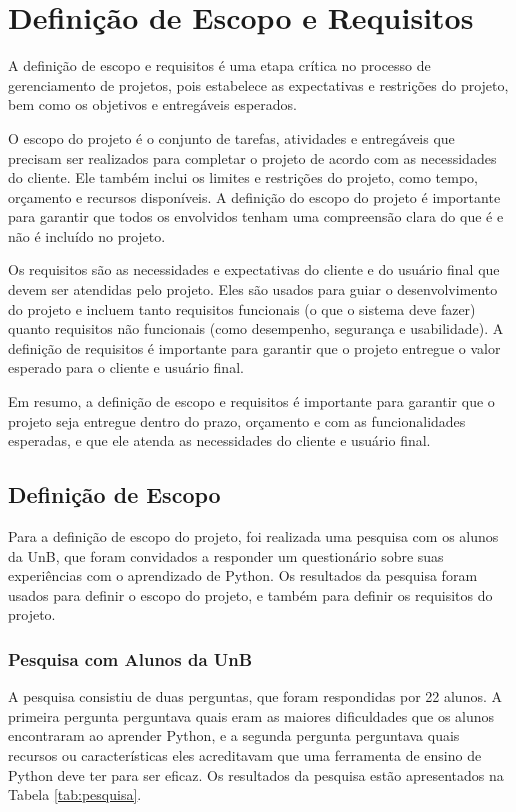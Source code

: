 \section{Definição de Escopo e Requisitos}

A definição de escopo e requisitos é uma etapa crítica no processo de gerenciamento de projetos, pois estabelece as expectativas e restrições do projeto, bem como os objetivos e entregáveis esperados.

O escopo do projeto é o conjunto de tarefas, atividades e entregáveis que precisam ser realizados para completar o projeto de acordo com as necessidades do cliente. Ele também inclui os limites e restrições do projeto, como tempo, orçamento e recursos disponíveis. A definição do escopo do projeto é importante para garantir que todos os envolvidos tenham uma compreensão clara do que é e não é incluído no projeto. \cite{Xavier2009}

Os requisitos são as necessidades e expectativas do cliente e do usuário final que devem ser atendidas pelo projeto. Eles são usados para guiar o desenvolvimento do projeto e incluem tanto requisitos funcionais (o que o sistema deve fazer) quanto requisitos não funcionais (como desempenho, segurança e usabilidade). A definição de requisitos é importante para garantir que o projeto entregue o valor esperado para o cliente e usuário final. \cite{Machado2018}

Em resumo, a definição de escopo e requisitos é importante para garantir que o projeto seja entregue dentro do prazo, orçamento e com as funcionalidades esperadas, e que ele atenda as necessidades do cliente e usuário final.

\subsection{Definição de Escopo}

Para a definição de escopo do projeto, foi realizada uma pesquisa com os alunos da UnB, que foram convidados a responder um questionário sobre suas experiências com o aprendizado de Python. Os resultados da pesquisa foram usados para definir o escopo do projeto, e também para definir os requisitos do projeto.

\subsubsection{Pesquisa com Alunos da UnB}

A pesquisa consistiu de duas perguntas, que foram respondidas por 22 alunos. A primeira pergunta perguntava quais eram as maiores dificuldades que os alunos encontraram ao aprender Python, e a segunda pergunta perguntava quais recursos ou características eles acreditavam que uma ferramenta de ensino de Python deve ter para ser eficaz. Os resultados da pesquisa estão apresentados na Tabela \ref{tab:pesquisa}.

